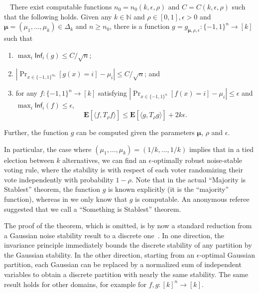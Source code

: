 \documentclass{toc}
\begin{document}
\begin{theorem}~\label{thm:Plurality}
There exist computable functions $n_0 = n_0(k,\epsilon,\rho)$ and
$C = C(k,\epsilon,\rho)$ such that the following holds. 
Given any $k \in \mathbb{N}$ and $\rho \in [0,1],\epsilon>0$ and 
$\boldsymbol{\mu} = (\mu_1, \ldots, \mu_k) \in \Delta_k$ and $n \geq
n_0$, there is a function $g = g_{\boldsymbol{\mu}, \rho, \epsilon}: \{-1,1\}^{n} \rightarrow [k]$ such that
\begin{enumerate}
    \item $\max_i \mathsf{Inf}_i(g) \le C/\sqrt{n}$;
    \item $|\Pr_{x \in \{-1,1\}^{n_0}}[g(x) = i ] - \mu_i| \leq  C / \sqrt{n}$; and
    \item for any $f: \{-1,1\}^n \rightarrow [k]$ satisfying $|\Pr_{x \in
\{-1,1\}^n} [f(x) = i ] - \mu_i| \leq \epsilon$ and $\max_i \mathsf{Inf}_i(f)
\le \epsilon$, 
\[
\mathbf{E}[\langle f, T_{\rho} f \rangle] \le \mathbf{E}[\langle g, T_{\rho} g \rangle] + 2 k \epsilon. 
\]
\end{enumerate}
Further, the function $g$ can be computed given the parameters $\boldsymbol{\mu}$, $\rho$ and $\epsilon$. 
\end{theorem}

In particular, the case where $(\mu_1,\ldots,\mu_k) = (1/k,\ldots,1/k)$ implies
that in a tied election between $k$ alternatives, we can find an
$\epsilon$-optimally robust
%
noise-stable   %
voting rule, where the stability is
with respect of each voter randomizing their vote independently with
probability $1-\rho$. Note that in the actual ``Majority is Stablest'' theorem,
the function $g$ is known explicitly (it is the ``majority'' function), whereas
in  we only know that $g$ is computable. An anonymous
referee suggested that we call  a ``Something is Stablest''
theorem.

The proof of the theorem, which is omitted, is by now a standard reduction from a Gaussian noise stability result to a discrete one~\cite{MOO10, IsakssonMossel:12, DMN:sos-journal}. In one direction, the invariance principle immediately bounds the discrete stability of any partition by the Gaussian stability. In the other direction, starting from an $\epsilon$-optimal Gaussian partition, each Gaussian can be replaced by a normalized sum of independent variables to obtain a discrete partition with nearly the same stability.  
The same result holds for other domains, for example for $f,g : [k]^n \to [k]$.
\end{document}
